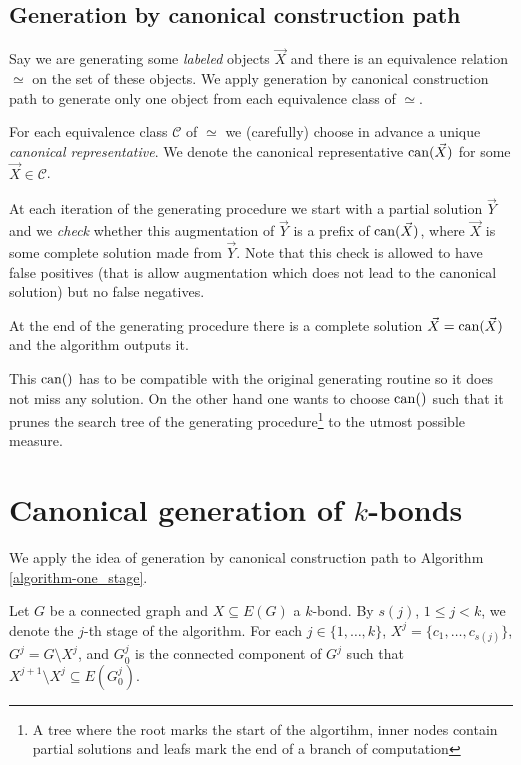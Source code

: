 \subsection*{Generation by canonical construction path}

Say we are generating some \textit{labeled} objects $\vec X$ and there is an equivalence relation $\simeq$ on the set of these objects. We apply generation by canonical construction path to generate only one object from each equivalence class of $\simeq$.

For each equivalence class $\mathcal{C}$ of $\simeq$ we (carefully) choose in advance a unique \textit{canonical representative}. We denote the canonical representative $\operatorname{can}(\vec X)$ for some $\vec X \in \mathcal{C}$.

At each iteration of the generating procedure we start with a partial solution $\vec Y$ and we \textit{check} whether this augmentation of $\vec Y$ is a prefix of $\operatorname{can}(\vec X)$, where $\vec X$ is some complete solution made from $\vec Y$. Note that this check is allowed to have false positives (that is allow augmentation which does not lead to the canonical solution) but no false negatives.

At the end of the generating procedure there is a complete solution $\vec X = \operatorname{can}(\vec X)$ and the algorithm outputs it.

\sectionline

This $\operatorname{can}()$ has to be compatible with the original generating routine so it does not miss any solution. On the other hand one wants to choose $\operatorname{can}()$ such that it prunes the search tree of the generating procedure\footnote{A tree where the root marks the start of the algortihm, inner nodes contain partial solutions and leafs mark the end of a branch of computation} to the utmost possible measure.

\section{Canonical generation of $k$-bonds}

We apply the idea of generation by canonical construction path to Algorithm \ref{algorithm-one_stage}.

\begin{rec}
	Let $G$ be a connected graph and $X \subseteq E(G)$ a $k$-bond. By $s(j)$, $1 \leq j < k$, we denote the $j$-th stage of the algorithm. For each \break $j \in \{1, \ldots, k\}$, $X^{j} = \{c_{1}, \ldots, c_{s(j)}\}$, $G^j = G \setminus X^{j}$, and $G^j_0$ is the connected component of $G^j$ such that $X^{j+1} \setminus X^{j} \subseteq E(G^j_0)$.
\end{rec}

